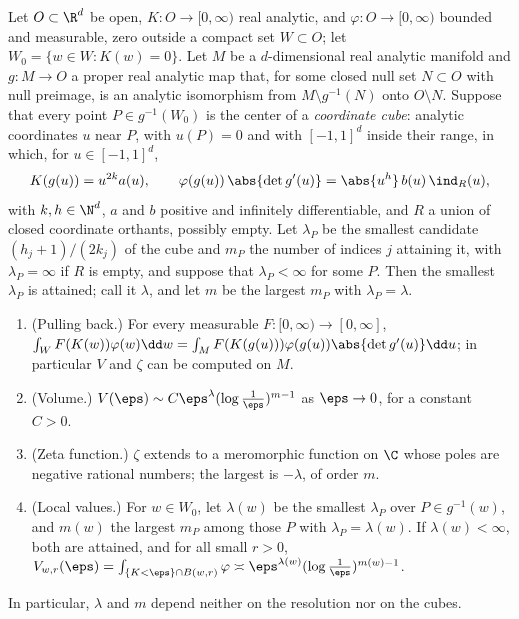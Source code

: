 \begin{refsection}
\begin{theorem}\label{thm:blowups:pullback}
Let $O\subset\R^d$ be open, $K\colon O\to[0,\infty)$ real analytic, and $\varphi\colon O\to[0,\infty)$ bounded and measurable, zero outside a compact set $W\subset O$; let $W_0=\{w\in W:K(w)=0\}$. Let $M$ be a $d$-dimensional real analytic manifold and $g\colon M\to O$ a proper real analytic map that, for some closed null set $N\subset O$ with null preimage, is an analytic isomorphism from $M\setminus g^{-1}(N)$ onto $O\setminus N$. Suppose that every point $P\in g^{-1}(W_0)$ is the center of a \emph{coordinate cube}: analytic coordinates $u$ near $P$, with $u(P)=0$ and with $[-1,1]^d$ inside their range, in which, for $u\in[-1,1]^d$,
\begin{equation}\label{eq:blowups:nc}
K(g(u))=u^{2k}a(u),\qquad\varphi(g(u))\,\abs{\det g'(u)}=\abs{u^h}\,b(u)\,\ind_R(u),
\end{equation}
with $k,h\in\N^d$, $a$ and $b$ positive and infinitely differentiable, and $R$ a union of closed coordinate orthants, possibly empty. Let $\lambda_P$ be the smallest candidate $(h_j+1)/(2k_j)$ of the cube and $m_P$ the number of indices $j$ attaining it, with $\lambda_P=\infty$ if $R$ is empty, and suppose that $\lambda_P<\infty$ for some $P$. Then the smallest $\lambda_P$ is attained; call it $\lambda$, and let $m$ be the largest $m_P$ with $\lambda_P=\lambda$.
\begin{enumerate}
\item (Pulling back.) For every measurable $F\colon[0,\infty)\to[0,\infty]$, $\int_WF(K(w))\varphi(w)\dd w=\int_MF(K(g(u)))\varphi(g(u))\abs{\det g'(u)}\dd u$; in particular $V$ and $\zeta$ can be computed on $M$.
\item (Volume.) $V(\eps)\sim C\eps^\lambda(\log\frac1\eps)^{m-1}$ as $\eps\to0$, for a constant $C>0$.
\item (Zeta function.) $\zeta$ extends to a meromorphic function on $\C$ whose poles are negative rational numbers; the largest is $-\lambda$, of order $m$.
\item (Local values.) For $w\in W_0$, let $\lambda(w)$ be the smallest $\lambda_P$ over $P\in g^{-1}(w)$, and $m(w)$ the largest $m_P$ among those $P$ with $\lambda_P=\lambda(w)$. If $\lambda(w)<\infty$, both are attained, and for all small $r>0$, $V_{w,r}(\eps)=\int_{\{K<\eps\}\cap B(w,r)}\varphi\asymp\eps^{\lambda(w)}(\log\frac1\eps)^{m(w)-1}$.
\end{enumerate}
In particular, $\lambda$ and $m$ depend neither on the resolution nor on the cubes.
\end{theorem}


\end{refsection}
